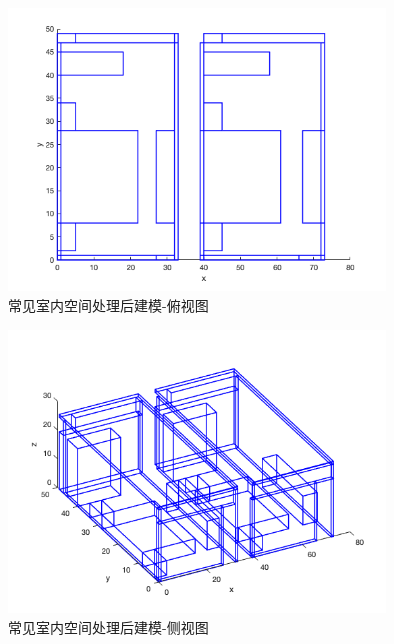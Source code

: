 \begin{figure}[!htb]
    \centering
    \includegraphics[width=10cm]{figures/test_complex_situation_pic_top.png}
    \caption{常见室内空间处理后建模-俯视图}
    \label{fig:test_common_situation_processed_pic_top}
\end{figure}
\begin{figure}[!htb]
    \centering
    \includegraphics[width=10cm]{figures/test_complex_situation_pic_lean.png}
    \caption{常见室内空间处理后建模-侧视图}
    \label{fig:test_common_situation_processed_pic_lean}
\end{figure}
